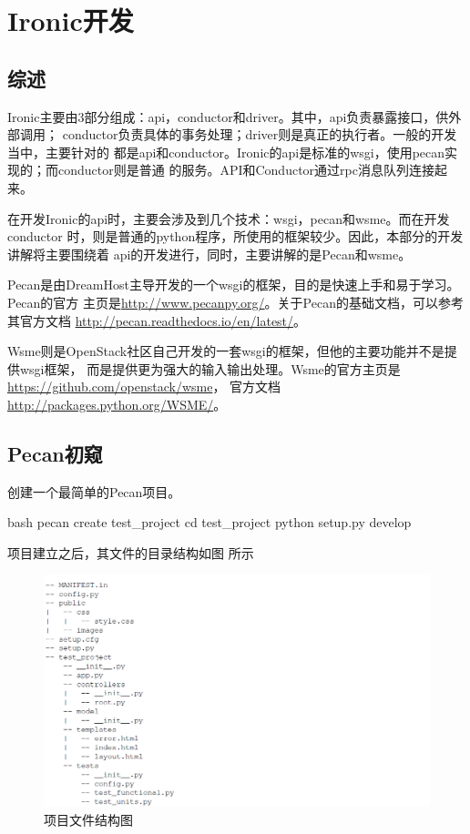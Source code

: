 \chapter{Ironic开发}

\section{综述}
Ironic主要由3部分组成：api，conductor和driver。其中，api负责暴露接口，供外部调用；
conductor负责具体的事务处理；driver则是真正的执行者。一般的开发当中，主要针对的
都是api和conductor。Ironic的api是标准的wsgi，使用pecan实现的；而conductor则是普通
的服务。API和Conductor通过rpc消息队列连接起来。

在开发Ironic的api时，主要会涉及到几个技术：wsgi，pecan和wsme。而在开发conductor
时，则是普通的python程序，所使用的框架较少。因此，本部分的开发讲解将主要围绕着
api的开发进行，同时，主要讲解的是Pecan和wsme。

Pecan是由DreamHost主导开发的一个wsgi的框架，目的是快速上手和易于学习。Pecan的官方
主页是\url{http://www.pecanpy.org/}。关于Pecan的基础文档，可以参考其官方文档
\url{http://pecan.readthedocs.io/en/latest/}。

Wsme则是OpenStack社区自己开发的一套wsgi的框架，但他的主要功能并不是提供wsgi框架，
而是提供更为强大的输入输出处理。Wsme的官方主页是\url{https://github.com/openstack/wsme}，
官方文档\url{http://packages.python.org/WSME/}。

\section{Pecan初窥}
\label{chap:start}
创建一个最简单的Pecan项目。
\begin{code-block}{bash}
pecan create test_project
cd test_project
python setup.py develop
\end{code-block}

项目建立之后，其文件的目录结构如图 所示
\begin{figure}[H]
  \centering
  \includegraphics[width=\linewidth]{pecan.png}
  \caption{项目文件结构图}
  \label{fig:pecan}
\end{figure}


